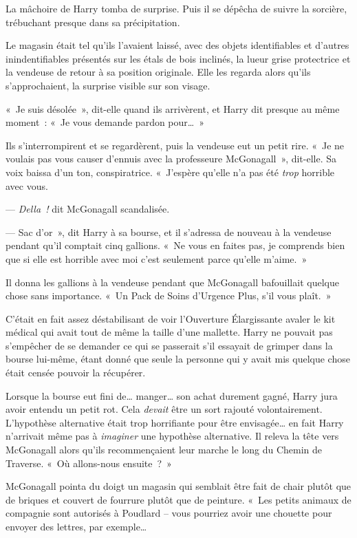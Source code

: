 La mâchoire de Harry tomba de surprise. Puis il se dépêcha de suivre la sorcière, trébuchant presque dans sa précipitation.

\later

Le magasin était tel qu'ils l'avaient laissé, avec des objets identifiables et d'autres inindentifiables présentés sur les étals de bois inclinés, la lueur grise protectrice et la vendeuse de retour à sa position originale.
Elle les regarda alors qu'ils s'approchaient, la surprise visible sur son visage.

«~Je suis désolée~», dit-elle quand ils arrivèrent, et Harry dit presque au même moment~: «~Je vous demande pardon pour…~»

Ils s'interrompirent et se regardèrent, puis la vendeuse eut un petit rire.
«~Je ne voulais pas vous causer d'ennuis avec la professeure McGonagall~», dit-elle.
Sa voix baissa d'un ton, conspiratrice.
«~J'espère qu'elle n'a pas été \emph{trop} horrible avec vous.

--- \emph{Della~!} dit McGonagall scandalisée.

--- Sac d'or~», dit Harry à sa bourse, et il s'adressa de nouveau à la vendeuse pendant qu'il comptait cinq gallions.
«~Ne vous en faites pas, je comprends bien que si elle est horrible avec moi c'est seulement parce qu'elle m'aime.~»

Il donna les gallions à la vendeuse pendant que McGonagall bafouillait quelque chose sans importance.
«~Un Pack de Soins d'Urgence Plus, s'il vous plaît.~»

C'était en fait assez déstabilisant de voir l'Ouverture Élargissante avaler le kit médical qui avait tout de même la taille d'une mallette.
Harry ne pouvait pas s'empêcher de se demander ce qui se passerait s'il essayait de grimper dans la bourse lui-même, étant donné que seule la personne qui y avait mis quelque chose était censée pouvoir la récupérer.

Lorsque la bourse eut fini de… manger… son achat durement gagné, Harry jura avoir entendu un petit rot.
Cela \emph{devait} être un sort rajouté volontairement.
L'hypothèse alternative était trop horrifiante pour être envisagée… en fait Harry n'arrivait même pas à \emph{imaginer} une hypothèse alternative.
Il releva la tête vers McGonagall alors qu'ils recommençaient leur marche le long du Chemin de Traverse. «~Où allons-nous ensuite~?~»

McGonagall pointa du doigt un magasin qui semblait être fait de chair plutôt que de briques et couvert de fourrure plutôt que de peinture.
«~Les petits animaux de compagnie sont autorisés à Poudlard -- vous pourriez avoir une chouette pour envoyer des lettres, par exemple…

